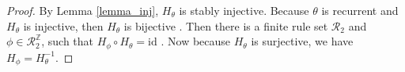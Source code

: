\documentclass[runningheads]{llncs}
\newcommand{\N}{\mathbb{N}}
\newcommand{\Z}{\mathbb{Z}}
\newcommand{\R}{\mathcal{R}}
\newcommand{\id}{\mathrm{id}}
\begin{document}
\begin{proof}
 By Lemma \ref{lemma_inj}, $H_\theta$ is stably injective. Because $\theta$ is recurrent and $H_\theta$ is injective, then $H_\theta$ is bijective \cite{goe}. Then there is a finite rule set $\mathcal{R}_2$ and $\phi \in \R_2^\Z$, such that $H_\phi \circ H_\theta = \id$ \cite{phung}. Now because $H_\theta$ is surjective,  we have $H_\phi = H_\theta^{-1}$.

%
%

\end{proof}
\end{document}
